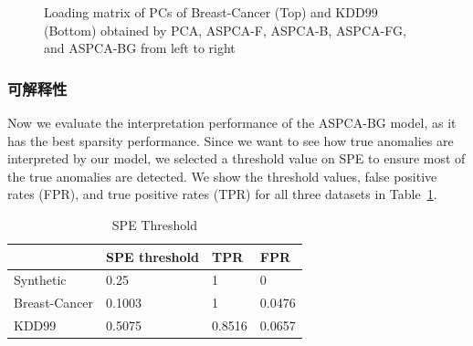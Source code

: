 \begin{figure}
\caption{Loading matrix of PCs of Breast-Cancer (Top) and KDD99 (Bottom) obtained by PCA, ASPCA-F, ASPCA-B, ASPCA-FG, and ASPCA-BG from left to right}
\label{fig:components}
\end{figure}

\subsubsection{可解释性}

Now we evaluate the interpretation performance of the ASPCA-BG model, as it has the best sparsity performance. Since we want to see how true anomalies are interpreted by our model, we selected a threshold value on SPE to ensure most of the true anomalies are detected. We show the threshold values, false positive rates (FPR), and true positive rates (TPR) for all three datasets in Table~\ref{table:threshold}.

\begin{table}
\small
\centering
\caption{SPE Threshold}
\begin{tabular}{|l|l|l|l|}
\hline
              & SPE threshold & TPR    & FPR    \\ \hline
Synthetic     & 0.25          & 1      & 0      \\ \hline
Breast-Cancer & 0.1003  & 1      & 0.0476 \\ \hline
KDD99        & 0.5075      & 0.8516 & 0.0657 \\ \hline
\end{tabular}
\label{table:threshold}
\end{table}

